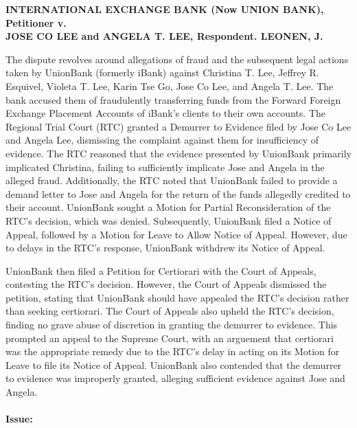 \documentclass[
12pt,
oneside,
onehalfspacing,
headsepline
]{DigestCollection}
\begin{document}
\label{2c220300-0a2c-11ef-a1a5-03b0bde1fccf}


\noindent\textbf{INTERNATIONAL EXCHANGE BANK (Now UNION BANK), Petitioner v. \\JOSE CO LEE and ANGELA T. LEE, Respondent. LEONEN, J.}\vspace{0.4cm}

The dispute revolves around allegations of fraud and the subsequent legal actions taken by UnionBank (formerly iBank) against Christina T. Lee, Jeffrey R. Esquivel, Violeta T. Lee, Karin Tse Go, Jose Co Lee, and Angela T. Lee. The bank accused them of fraudulently transferring funds from the Forward Foreign Exchange Placement Accounts of iBank's clients to their own accounts. The Regional Trial Court (RTC) granted a Demurrer to Evidence filed by Jose Co Lee and Angela Lee, dismissing the complaint against them for insufficiency of evidence. The RTC reasoned that the evidence presented by UnionBank primarily implicated Christina, failing to sufficiently implicate Jose and Angela in the alleged fraud. Additionally, the RTC noted that UnionBank failed to provide a demand letter to Jose and Angela for the return of the funds allegedly credited to their account. UnionBank sought a Motion for Partial Reconsideration of the RTC's decision, which was denied. Subsequently, UnionBank filed a Notice of Appeal, followed by a Motion for Leave to Allow Notice of Appeal. However, due to delays in the RTC's response, UnionBank withdrew its Notice of Appeal.

UnionBank then filed a Petition for Certiorari with the Court of Appeals, contesting the RTC's decision. However, the Court of Appeals dismissed the petition, stating that UnionBank should have appealed the RTC's decision rather than seeking certiorari. The Court of Appeals also upheld the RTC's decision, finding no grave abuse of discretion in granting the demurrer to evidence. This prompted an appeal to the Supreme Court, with an arguement that certiorari was the appropriate remedy due to the RTC's delay in acting on its Motion for Leave to file its Notice of Appeal. UnionBank also contended that the demurrer to evidence was improperly granted, alleging sufficient evidence against Jose and Angela. 

\paragraph{Issue:}
\label{3efde540-1213-11ef-aa24-9916ea601717}
\end{document}
